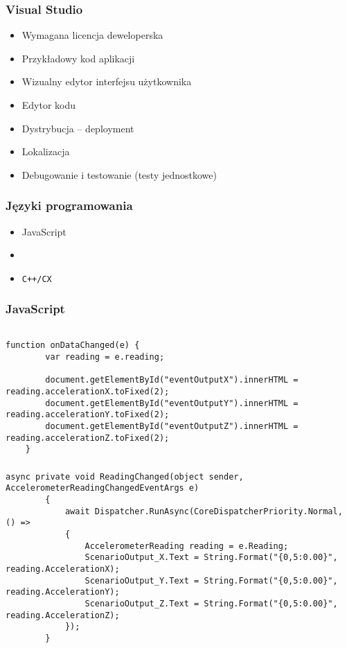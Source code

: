 \begin{frame}
\frametitle{Visual Studio}
\begin{itemize}
\item	Wymagana licencja deweloperska
\item	Przykładowy kod aplikacji
\item	Wizualny edytor interfejsu użytkownika
\item	Edytor kodu
\item	Dystrybucja -- deployment
\item	Lokalizacja
\item 	Debugowanie i testowanie (testy jednostkowe)
\end{itemize}
\end{frame}

\begin{frame}
\frametitle{Języki programowania}
\begin{itemize}
\item	JavaScript
\item	\Csharp
\item	\texttt{C++/CX}

\end{itemize}
\end{frame}


\begin{frame}[fragile]
\frametitle{JavaScript}
\begin{adjustbox}{width=\textwidth}
\begin{lstlisting}

function onDataChanged(e) { 
        var reading = e.reading; 
 
        document.getElementById("eventOutputX").innerHTML = reading.accelerationX.toFixed(2); 
        document.getElementById("eventOutputY").innerHTML = reading.accelerationY.toFixed(2); 
        document.getElementById("eventOutputZ").innerHTML = reading.accelerationZ.toFixed(2); 
    }  
\end{lstlisting}
\end{adjustbox}

\end{frame}

\begin{frame}[fragile]
\frametitle{\Csharp}
\begin{adjustbox}{width=\textwidth}
\begin{lstlisting}
async private void ReadingChanged(object sender, AccelerometerReadingChangedEventArgs e) 
        { 
            await Dispatcher.RunAsync(CoreDispatcherPriority.Normal, () => 
            { 
                AccelerometerReading reading = e.Reading; 
                ScenarioOutput_X.Text = String.Format("{0,5:0.00}", reading.AccelerationX); 
                ScenarioOutput_Y.Text = String.Format("{0,5:0.00}", reading.AccelerationY); 
                ScenarioOutput_Z.Text = String.Format("{0,5:0.00}", reading.AccelerationZ); 
            }); 
        } 
\end{lstlisting}
\end{adjustbox}
\end{frame}


